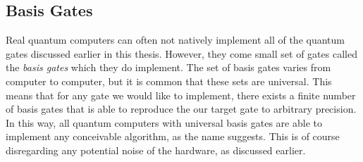 \subsection{Basis Gates}\label{sec:Basis Gates}
Real quantum computers can often not natively implement all of the quantum gates discussed earlier in this thesis. However, they come small set of gates called the \emph{basis gates} which they do implement. The set of basis gates varies from computer to computer, but it is common that these sets are universal. This means that for any gate we would like to implement, there exists a finite number of basis gates that is able to reproduce the our target gate to arbitrary precision. In this way, all quantum computers with universal basis gates are able to implement any conceivable algorithm, as the name suggests. This is of course disregarding any potential noise of the hardware, as discussed earlier. 




